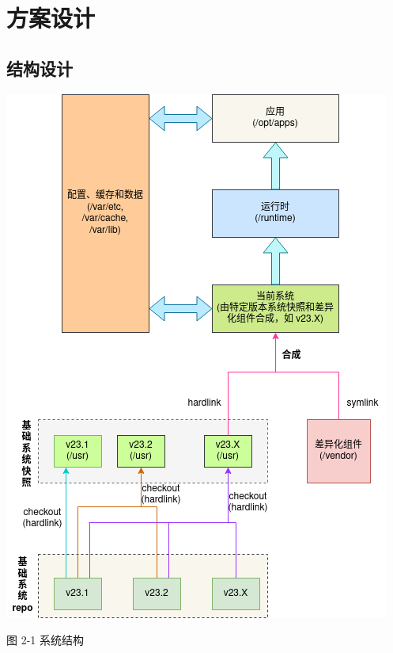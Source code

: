 \documentclass{utart}
\begin{document}
\section{方案设计}
\subsection{结构设计}
\begin{center}
  \begin{adjustbox}{scale=0.55}
    \includegraphics{./uos_structure_design.png}
  \end{adjustbox}

  图 2-1 系统结构
\end{center}
\end{document}

